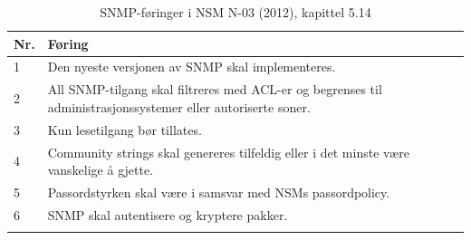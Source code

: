 \begin{table}[H]

\centering

\caption{SNMP-føringer i NSM N-03 (2012), kapittel 5.14}

\label{tab:snmp-krav}

\small

\renewcommand{\arraystretch}{1.25}

\begin{tabular}{@{}ll@{}}

\toprule

\parbox[t]{0.1\textwidth}{\textbf{Nr.}} & \parbox[t]{0.7\textwidth}{\textbf{Føring}} \\

\midrule

\parbox[t]{0.1\textwidth}{1} & \parbox[t]{0.7\textwidth}{\raggedright Den nyeste versjonen av SNMP skal implementeres.} \\

\addlinespace

\parbox[t]{0.1\textwidth}{2} & \parbox[t]{0.7\textwidth}{\raggedright All SNMP-tilgang skal filtreres med ACL-er og begrenses til administrasjonssystemer eller autoriserte soner.} \\

\addlinespace

\parbox[t]{0.1\textwidth}{3} & \parbox[t]{0.7\textwidth}{\raggedright Kun lesetilgang bør tillates.} \\

\addlinespace

\parbox[t]{0.1\textwidth}{4} & \parbox[t]{0.7\textwidth}{\raggedright Community strings skal genereres tilfeldig eller i det minste være vanskelige å gjette.} \\

\addlinespace

\parbox[t]{0.1\textwidth}{5} & \parbox[t]{0.7\textwidth}{\raggedright Passordstyrken skal være i samsvar med NSMs passordpolicy.} \\

\addlinespace

\parbox[t]{0.1\textwidth}{6} & \parbox[t]{0.7\textwidth}{\raggedright SNMP skal autentisere og kryptere pakker.} \\

\addlinespace

\addlinespace

\bottomrule

\end{tabular}

\end{table}

